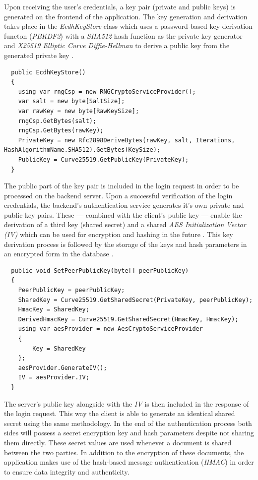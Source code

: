 Upon receiving the user's credentials, a key pair (private and public keys) is generated on the frontend of the application.
The key generation and derivation takes place in the \emph{EcdhKeyStore} class which uses a password-based key derivation functon (\emph{PBKDF2}) with a \emph{SHA512} hash function
as the private key generator and \emph{X25519 Elliptic Curve Diffie-Hellman} to derive a public key from the generated private key \cite{bernstein2006curve25519}.

\begin{lstlisting}
  public EcdhKeyStore()
  {
	using var rngCsp = new RNGCryptoServiceProvider();
	var salt = new byte[SaltSize];
	var rawKey = new byte[RawKeySize];
	rngCsp.GetBytes(salt);
	rngCsp.GetBytes(rawKey);
	PrivateKey = new Rfc2898DeriveBytes(rawKey, salt, Iterations, HashAlgorithmName.SHA512).GetBytes(KeySize);
	PublicKey = Curve25519.GetPublicKey(PrivateKey);  
  }
\end{lstlisting}

The public part of the key pair is included in the login request in order to be processed on the backend server.
Upon a successful verification of the login credentials, the backend's authentication service generates it's own private and public key pairs.
These --- combined with the client's public key --- enable the derivation of a third key (shared secret) and a shared \emph{AES Initialization Vector (IV)} which can be used for encryption and hashing in the future \cite{abdullah2017advanced}.
This key derivation process is followed by the storage of the keys and hash parameters in an encrypted form in the database \cite{gorman2020encryption}.

\begin{lstlisting}
  public void SetPeerPublicKey(byte[] peerPublicKey)
  {
	PeerPublicKey = peerPublicKey;
	SharedKey = Curve25519.GetSharedSecret(PrivateKey, peerPublicKey);
	HmacKey = SharedKey;
	DerivedHmacKey = Curve25519.GetSharedSecret(HmacKey, HmacKey);
	using var aesProvider = new AesCryptoServiceProvider
	{
		Key = SharedKey
	};
	aesProvider.GenerateIV();
	IV = aesProvider.IV;
  }
\end{lstlisting}

The server's public key alongside with the \emph{IV} is then included in the response of the login request.
This way the client is able to generate an identical shared secret using the same methodology.
In the end of the authentication process both sides will possess a secret encryption key and hash parameters despite not sharing them directly.
These secret values are used whenever a document is shared between the two parties.
In addition to the encryption of these documents, the application makes use of the hash-based message authentication (\emph{HMAC}) in order to 
ensure data integrity and authenticity.

